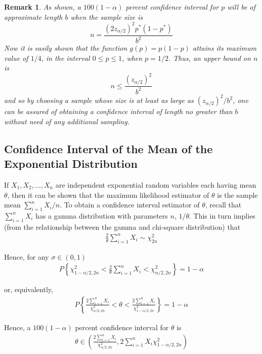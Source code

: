 \documentclass[12pt]{article}
\newtheorem{remark}[theorem]{Remark}
\begin{document}
\begin{remark}
  As shown, a $100(1-\alpha)$ percent confidence interval for $p$ will be of approximate length $b$ when the sample size is
  \begin{equation*}
    n = \frac {(2 z_{\alpha / 2})^2 p^* (1 - p^*)}{b^2}
  \end{equation*}
  Now it is easily shown that the function $g(p) = p(1-p)$ attains its maximum value of $1/4$, in the interval $0 \le p \le 1$, when $p = 1/2$. Thus, an upper bound on $n$ is
  \begin{equation*}
    n \le \frac {(z_{\alpha / 2})^2}{b^2}
  \end{equation*}
  and so by choosing a sample whose size is at least as large as $(z_{\alpha / 2})^2/b^2$, one can be assured of obtaining a confidence interval of length no greater than $b$ without need of any additional sampling.
\end{remark}

\subsection{Confidence Interval of the Mean of the Exponential Distribution}

If $X_1, X_2, \dots, X_n$ are independent exponential random variables each having mean $\theta$, then it can be shown that the maximum likelihood estimator of $\theta$ is the sample mean $\sum_{i=1}^n X_i / n$. To obtain a confidence interval estimator of $\theta$, recall that $\sum_{i=1}^n X_i$ has a gamma distribution with parameters $n$, $1 / \theta$. This in turn implies (from the relationship between the gamma and chi-square distribution) that
\begin{eqnarray*}
  \frac {2}{\theta} \sum_{i=1}^n X_i \sim \chi_{2n}^2
\end{eqnarray*}

Hence, for any $\sigma \in (0,1)$
\begin{eqnarray*}
  P \left\{ \chi_{1-\alpha / 2, 2n}^2
    < \frac {2}{\theta} \sum_{i=1}^n X_i
    < \chi_{\alpha / 2, 2n}^2 \right\} = 1 - \alpha
\end{eqnarray*}

or, equivalently,
\begin{eqnarray*}
  P \left\{ \frac {2 \sum_{i=1}^n X_i}{\chi_{\alpha / 2, 2n}^2}
    < \theta <\frac {2 \sum_{i=1}^n X_i}{\chi_{1-\alpha / 2, 2n}^2}
  \right\} = 1 - \alpha
\end{eqnarray*}

Hence, a $100(1 - \alpha)$ percent confidence interval for $\theta$ is
\begin{eqnarray*}
  \theta \in \left(
    \frac {2 \sum_{i=1}^n X_i}{\chi_{\alpha / 2, 2n}^2}
    ,{2 \sum_{i=1}^n X_i}{\chi_{1-\alpha / 2, 2n}^2} \right)
\end{eqnarray*}
\end{document}
